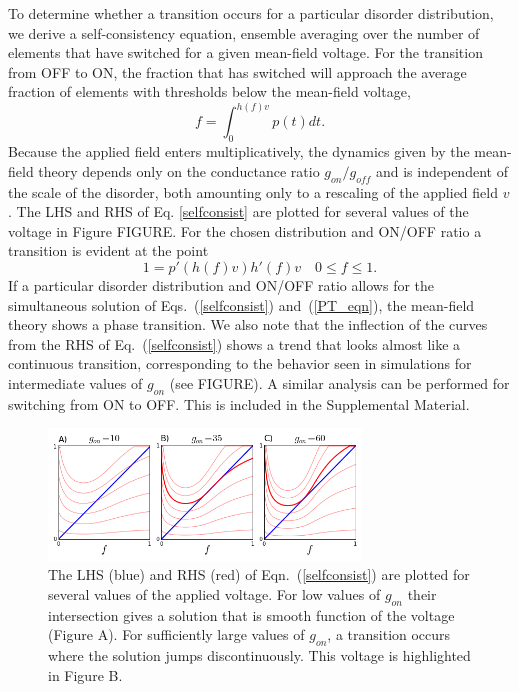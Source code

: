 \documentclass[aps,prl,reprint,groupedaddress]{revtex4-1}
\begin{document}
To determine whether a transition occurs for a particular disorder
distribution, we derive a
self-consistency equation, ensemble averaging over the number of elements
that have switched for a given mean-field voltage. For the transition from
OFF to ON, the fraction that has switched will approach the average fraction
of elements with thresholds below the mean-field voltage,
\begin{equation}\label{selfconsist}
f = \int_0^{h(f) v} p(t) dt.
\end{equation}
Because the applied field enters multiplicatively, the dynamics given by
the mean-field theory depends only on the conductance ratio $g_{on}/g_{off}$
and is independent of the scale of the disorder, both amounting only to
a rescaling of the applied field $v$.  The LHS and
RHS of Eq. \ref{selfconsist} are plotted for several values of the voltage
in Figure FIGURE.  For
the chosen distribution and ON/OFF ratio a transition is evident at the
point
\begin{equation}\label{PT_eqn}
1 = p'(h(f)v)h'(f)v \quad 0\le f\le 1.
\end{equation}
If a particular disorder distribution and ON/OFF ratio allows for the
simultaneous solution of Eqs.~(\ref{selfconsist}) and~(\ref{PT_eqn}), the mean-field
theory shows a phase transition. We also note that the inflection
of the curves from the RHS of Eq.~(\ref{selfconsist}) shows a trend that looks almost like a continuous
transition, corresponding to the behavior seen in simulations for intermediate
values of $g_{on}$ (see FIGURE).
A similar analysis can be performed
for switching from ON to OFF. This is included in the Supplemental Material.

\begin{figure}
\includegraphics[width=8.3cm]{MF_self_consist.png}
\caption{The LHS (blue) and RHS (red) of Eqn.~(\ref{selfconsist}) are plotted
for several values of the applied voltage.  For low values of $g_{on}$ their
intersection gives a solution that is smooth function of the voltage (Figure A).
For sufficiently large values of $g_{on}$, a transition occurs where the
solution jumps discontinuously.  This voltage is highlighted in Figure B.
\label{MF_SC_fig}}
\end{figure}
\end{document}

